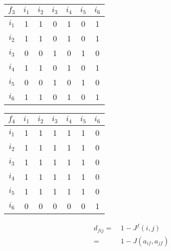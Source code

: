 \begin{table}[p]
\begin{center}
    \begin{tabular}{ | c | c | c | c | c | c | c | } 
    \hline
     $f_3$ & $i_1$ & $i_2$ & $i_3$ & $i_4$ & $i_5$ & $i_6$  \\ \hline
     $i_1$ & 1  &  1  &  0  &  1  &  0  &  1 \\ \hline
     $i_2$ & 1  &  1  &  0  &  1  &  0  &  1  \\ \hline
     $i_3$ & 0  &  0  &  1  &  0  &  1  &  0 \\ \hline
     $i_4$ & 1  &  1  &  0  &  1  &  0  &  1 \\ \hline
     $i_5$ & 0  &  0  &  1  &  0  &  1  &  0 \\ \hline
     $i_6$ & 1  &  1  &  0  &  1  &  0  &  1 \\ \hline
    \end{tabular}    
    \quad
    \begin{tabular}{ | c | c | c | c | c | c | c | } 
    \hline
     $f_4$ & $i_1$ & $i_2$ & $i_3$ & $i_4$ & $i_5$ & $i_6$  \\ \hline
     $i_1$ & 1  &  1  &  1 &   1 &   1  &  0 \\ \hline
     $i_2$ & 1  &  1  &  1 &   1 &   1  &  0  \\ \hline
     $i_3$ & 1  &  1  &  1 &   1 &   1  &  0 \\ \hline
     $i_4$ & 1  &  1  &  1 &   1 &   1  &  0 \\ \hline
     $i_5$ & 1  &  1  &  1 &   1 &   1  &  0 \\ \hline
     $i_6$ & 0  &  0  &  0 &   0 &   0  &  1 \\ \hline
    \end{tabular}        
\end{center}
\end{table}


\begin{equation}
\label{eq:dfij_jaccard}
\begin{split}
d_{fij} =&~ 1-J^f(i,j) \\
    =&~ 1-J(a_{if},a_{jf})
\end{split} 
\end{equation}

